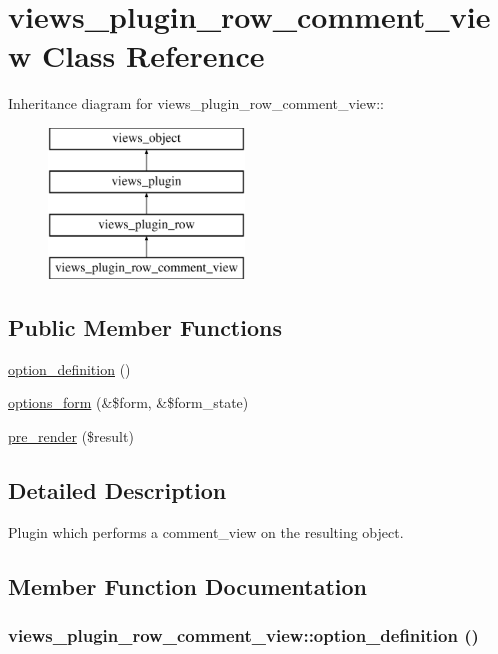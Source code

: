 \hypertarget{classviews__plugin__row__comment__view}{
\section{views\_\-plugin\_\-row\_\-comment\_\-view Class Reference}
\label{classviews__plugin__row__comment__view}
}
Inheritance diagram for views\_\-plugin\_\-row\_\-comment\_\-view::\begin{figure}[H]
\begin{center}
\leavevmode
\includegraphics[height=4cm]{classviews__plugin__row__comment__view}
\end{center}
\end{figure}
\subsection*{Public Member Functions}
\begin{CompactItemize}
\item 
\hyperlink{classviews__plugin__row__comment__view_ec46add7efd08b097100a4cc6d60b50e}{option\_\-definition} ()
\item 
\hyperlink{classviews__plugin__row__comment__view_7dd276ec1a14a2d34f80a8020557608a}{options\_\-form} (\&\$form, \&\$form\_\-state)
\item 
\hyperlink{classviews__plugin__row__comment__view_0cb891a0afff2975d9a04c9d879ee5a5}{pre\_\-render} (\$result)
\end{CompactItemize}


\subsection{Detailed Description}
Plugin which performs a comment\_\-view on the resulting object. 

\subsection{Member Function Documentation}
\hypertarget{classviews__plugin__row__comment__view_ec46add7efd08b097100a4cc6d60b50e}{
\subsubsection[{option\_\-definition}]{\setlength{\rightskip}{0pt plus 5cm}views\_\-plugin\_\-row\_\-comment\_\-view::option\_\-definition ()}}
\label{classviews__plugin__row__comment__view_ec46add7efd08b097100a4cc6d60b50e}


